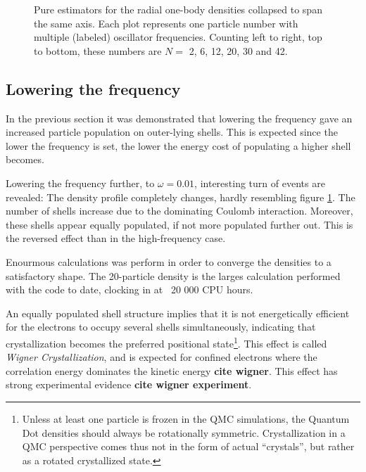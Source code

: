 \begin{figure}
\begin{center}
  \caption{Pure estimators for the radial one-body densities collapsed to span the same axis. Each plot represents one particle number with multiple (labeled) oscillator frequencies. Counting left to right, top to bottom, these numbers are $N=$ 2, 6, 12, 20, 30 and 42.}
  \label{fig:OBD_pure_collapsed}
 \end{center}
\end{figure}


\subsection{Lowering the frequency}

In the previous section it was demonstrated that lowering the frequency gave an increased particle population on outer-lying shells. This is expected since the lower the frequency is set, the lower the energy cost of populating a higher shell becomes.

Lowering the frequency further, to $\omega=0.01$, interesting turn of events are revealed: The density profile completely changes, hardly resembling figure \ref{fig:OBD_pure_collapsed}. The number of shells increase due to the dominating Coulomb interaction. Moreover, these shells appear equally populated, if not more populated further out. This is the reversed effect than in the high-frequency case.

Enourmous calculations was perform in order to converge the densities to a satisfactory shape. The 20-particle density is the larges calculation performed with the code to date, clocking in at ~20 000 CPU hours.

An equally populated shell structure implies that it is not energetically efficient for the electrons to occupy several shells simultaneously, indicating that crystallization becomes the preferred positional state\footnote{Unless at least one particle is frozen in the QMC simulations, the Quantum Dot densities should always be rotationally symmetric. Crystallization in a QMC perspective comes thus not in the form of actual ``crystals'', but rather as a rotated crystallized state.}. This effect is called \textit{Wigner Crystallization}, and is expected for confined electrons where the correlation energy dominates the kinetic energy \textbf{cite wigner}. This effect has strong experimental evidence \textbf{cite wigner experiment}. 


